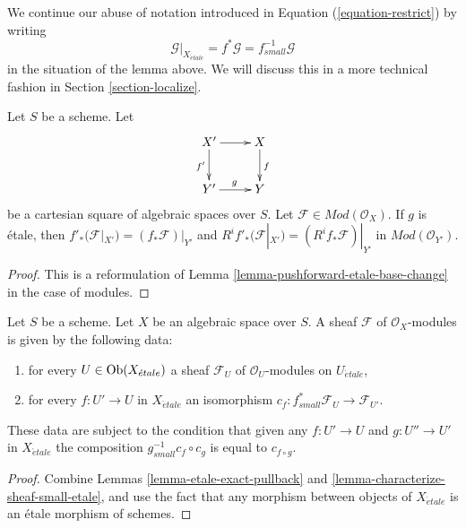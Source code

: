 \noindent
We continue our abuse of notation introduced in
Equation (\ref{equation-restrict})
by writing
\begin{equation}
\label{equation-restrict-modules}
\mathcal{G}|_{X_{\acute{e}tale}}
= f^*\mathcal{G}
= f_{small}^{-1}\mathcal{G}
\end{equation}
in the situation of the lemma above. We will discuss this in a more
technical fashion in
Section \ref{section-localize}.

\begin{lemma}
\label{lemma-pushforward-etale-base-change-modules}
Let $S$ be a scheme. Let
$$
\xymatrix{
X' \ar[r] \ar[d]_{f'} & X \ar[d]^f \\
Y' \ar[r]^g & Y
}
$$
be a cartesian square of algebraic spaces over $S$. Let
$\mathcal{F} \in \textit{Mod}(\mathcal{O}_X)$. If $g$ is \'etale, then
$f'_*(\mathcal{F}|_{X'}) = (f_*\mathcal{F})|_{Y'}$ and
$R^if'_*(\mathcal{F}|_{X'}) = (R^if_*\mathcal{F})|_{Y'}$ in
$\textit{Mod}(\mathcal{O}_{Y'})$.
\end{lemma}

\begin{proof}
This is a reformulation of
Lemma \ref{lemma-pushforward-etale-base-change}
in the case of modules.
\end{proof}

\begin{lemma}
\label{lemma-characterize-module-small-etale}
Let $S$ be a scheme. Let $X$ be an algebraic space over $S$.
A sheaf $\mathcal{F}$ of $\mathcal{O}_X$-modules is given by the following
data:
\begin{enumerate}
\item for every $U \in \mathop{\rm Ob}\nolimits(X_{\acute{e}tale})$ a sheaf
$\mathcal{F}_U$ of $\mathcal{O}_U$-modules on $U_{\acute{e}tale}$,
\item for every $f : U' \to U$ in $X_{\acute{e}tale}$ an isomorphism
$c_f : f_{small}^*\mathcal{F}_U \to \mathcal{F}_{U'}$.
\end{enumerate}
These data are subject to the condition that given any $f : U' \to U$
and $g : U'' \to U'$ in $X_{\acute{e}tale}$ the composition
$g_{small}^{-1}c_f \circ c_g$ is equal to $c_{f \circ g}$.
\end{lemma}

\begin{proof}
Combine Lemmas \ref{lemma-etale-exact-pullback}
and \ref{lemma-characterize-sheaf-small-etale}, and use the fact that
any morphism between objects of $X_{\acute{e}tale}$ is an \'etale morphism
of schemes.
\end{proof}







